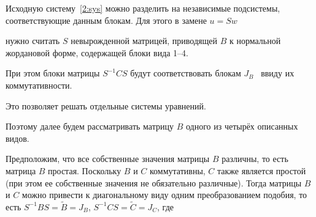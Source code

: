 Исходную систему~\eqref{2:sys} можно разделить на независимые подсистемы, соответствующие данным блокам. Для этого в замене $u=Sw$

нужно считать $S$ невырожденной матрицей, приводящей $B$ к нормальной жордановой форме, содержащей блоки вида 1--4.

При этом блоки матрицы $S^{-1}CS$ будут соответствовать блокам $J_B$~\cite{kozlova:bib:Gantmaher} ввиду их коммутативности.

Это позволяет решать отдельные системы уравнений.

Поэтому далее будем рассматривать матрицу $B$ одного из четырёх описанных видов.



\smallskip




Предположим, что все собственные значения матрицы $B$ различны, то есть матрица $B$ простая. Поскольку $B$ и $C$ коммутативны, $C$ также является простой~\cite{kozlova:bib:Lankaster} (при этом ее собственные значения не обязательно различные). Тогда матрицы $B$ и $C$ можно привести к диагональному виду одним преобразованием подобия, то есть  $S^{-1}BS=\widetilde{B}=J_B$, $S^{-1}CS=\widetilde{C}=J_C$, где

